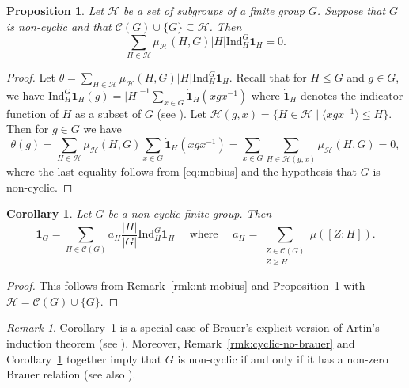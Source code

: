 \documentclass[12pt]{amsart}
\theoremstyle{plain}
\newtheorem{corollary}[theorem]{Corollary}
\newtheorem{prop}[theorem]{Proposition}
\theoremstyle{remark}
\newtheorem{remark}[theorem]{Remark}
\theoremstyle{definition}
\newcommand{\Ind}{\mathrm{Ind}}
\numberwithin{equation}{section}
\begin{document}
\begin{prop}\cite{MR332947}\label{prop:Brauer-relations-from-mobius}
Let $\mathcal{H}$ be a set of subgroups of a finite group $G$.
Suppose that $G$ is non-cyclic and that $\mathcal{C}(G) \cup \{ G \} \subseteq \mathcal{H}$.
Then
\[
\sum_{H \in \mathcal{H}} \mu_{\mathcal{H}}(H,G) |H| \Ind_{H}^{G}\mathbf{1}_{H} = 0.
\]
\end{prop}

\begin{proof}
Let $\theta = \sum_{H \in \mathcal{H}} \mu_{\mathcal{H}}(H,G) |H| \Ind_{H}^{G}\mathbf{1}_{H}$.
Recall that for $H \leq G$ and $g \in G$, we have 
$\Ind_{H}^{G}\mathbf{1}_{H}(g) = |H|^{-1}\sum_{x \in G} \dot{\mathbf{1}}_{H}(xgx^{-1})$
where $\dot{\mathbf{1}}_{H}$ denotes the indicator function of $H$ 
as a subset of $G$ (see \cite[(10.3)]{MR632548}). 
Let $\mathcal{H}(g,x) =\{ H \in \mathcal{H} \mid \langle xgx^{-1} \rangle \leq H \}$.
Then for $g \in G$ we have
\[
\theta(g) 
= \sum_{H \in \mathcal{H}} \mu_{\mathcal{H}}(H,G) \sum_{x \in G} \dot{\mathbf{1}}_{H}(xgx^{-1})
= \sum_{x \in G} \sum_{H \in \mathcal{H}(g,x)} 
\mu_{\mathcal{H}}(H,G) = 0,
\]
where the last equality follows from \eqref{eq:mobius} and the hypothesis that $G$ is non-cyclic.
\end{proof}

\begin{corollary}\label{cor:special-case-Artin-induction}
Let $G$ be a non-cyclic finite group. Then
\[
\mathbf{1}_{G} 
= \sum_{H \in \mathcal{C}(G)} a_{H} \frac{|H|}{|G|} \Ind^{G}_{H} \mathbf{1}_{H}
\quad \text{ where } \quad
a_{H} = \sum_{\substack{Z \in \mathcal{C}(G) \\ Z \geq H}} \mu([Z:H]).
\]
\end{corollary}

\begin{proof}
This follows from Remark~\ref{rmk:nt-mobius} and 
Proposition~\ref{prop:Brauer-relations-from-mobius} with 
$\mathcal{H} = \mathcal{C}(G) \cup \{ G \}$.
\end{proof}

\begin{remark}
Corollary~\ref{cor:special-case-Artin-induction} is a special case of Brauer's explicit version of Artin's induction theorem (see \cite[(15.4)]{MR632548}). Moreover, Remark~\ref{rmk:cyclic-no-brauer} and 
Corollary~\ref{cor:special-case-Artin-induction} together imply 
that $G$ is non-cyclic if and only if it has a non-zero Brauer relation
(see also \cite[Theorem~8]{MR511862}).
\end{remark}
\end{document}

